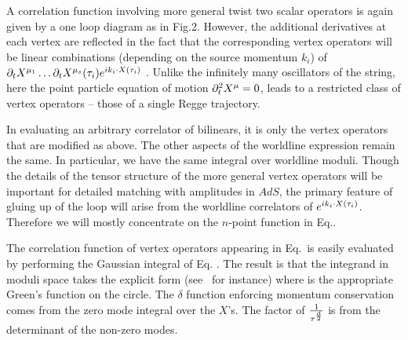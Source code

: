 A correlation function involving more general twist two scalar operators is again given by a 
one loop diagram as in Fig.2. However, the additional derivatives at each vertex are
reflected in the fact that the corresponding vertex operators will be linear combinations
(depending on the source momentum $k_i$) of 
$\partial_tX^{\mu_1}\ldots\partial_tX^{\mu_s}({\tau}_i)e^{ik_i\cdot X({\tau}_i)}$
. Unlike the infinitely many oscillators of the string, 
here the point particle
equation of motion $\partial_t^2X^{\mu}=0$, leads to a restricted class of vertex 
operators -- those of a single Regge trajectory. 

In evaluating an arbitrary correlator of bilinears, it is only the vertex operators that 
are modified as above. 
The other aspects of the worldline expression remain the same.
In particular, we have the same integral over worldline moduli. Though the details of 
the tensor structure of the more general vertex operators will be important for detailed
matching with amplitudes in $AdS$, the primary feature of gluing up of the loop will arise
from the worldline correlators of $e^{ik_i\cdot X({\tau}_i)}$. 
Therefore we will mostly
concentrate on the $n$-point function in Eq.\wlnpt .

The correlation function of vertex operators appearing in Eq.\wlnpt\ is easily evaluated
by  performing the Gaussian integral of Eq. \wlcorr . The result is that the 
integrand in moduli space takes the explicit form (see \polbk\ for instance)
\eqn{}
where   
\eqn{}
is the appropriate Green's function on the circle. The $\delta$ function enforcing momentum 
conservation comes from the zero mode integral over the $X$'s. The factor of ${1\over {\tau}^{d\over 2}}$
is from the determinant of the non-zero modes.


